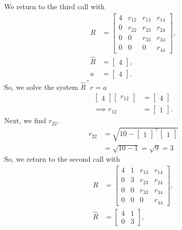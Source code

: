 \documentclass{report}
\begin{document}
\begin{remark}
    \bigbreak \noindent 
    We return to the third call with
    \begin{align*}
        R &= \begin{bmatrix} 4 & r_{12} & r_{13} & r_{14} \\ 0 & r_{22} & r_{23} & r_{24} \\ 0 & 0 & r_{33} & r_{34} \\ 0 & 0 & 0 & r_{44} \end{bmatrix}, \\
        \hat{R} &= \begin{bmatrix} 4 \end{bmatrix}, \\
        a &= \begin{bmatrix} 4 \end{bmatrix}
    .\end{align*}
    So, we solve the system $\hat{R}^{\top}r = a $
    \begin{align*}
        \begin{bmatrix} 4 \end{bmatrix} \begin{bmatrix} r_{12} \end{bmatrix} &= \begin{bmatrix} 4 \end{bmatrix} \\
        \implies r_{12} &= \begin{bmatrix} 1 \end{bmatrix}
    .\end{align*}
    Next, we find $r_{22}$.
    \begin{align*}
        r_{22} &= \sqrt{10 - \begin{bmatrix} 1 \end{bmatrix}^{\top} \begin{bmatrix} 1 \end{bmatrix}}  \\
               &= \sqrt{10 - 1} = \sqrt{9} = 3
    \end{align*}
    So, we return to the second call with
    \begin{align*}
        R &= \begin{bmatrix} 4 & 1 & r_{13} & r_{14} \\ 0 & 3 & r_{23} & r_{24} \\ 0 & 0 & r_{33} & r_{34} \\ 0 & 0 & 0 & r_{44} \end{bmatrix}, \\
        \hat{R} &= \begin{bmatrix} 4 & 1 \\ 0 & 3 \end{bmatrix}, \\

\end{align*}
\end{remark}
\end{document}
